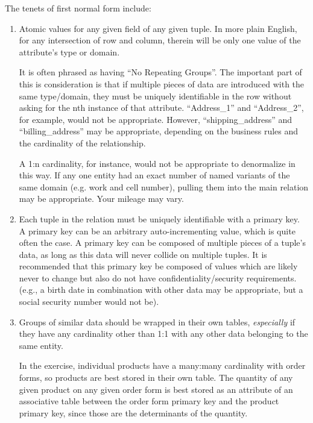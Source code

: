 \documentclass{article}
\begin{document}
The tenets of first normal form include:
\begin{enumerate}
	\item Atomic values for any given field of any given tuple. In
		more plain English, for any intersection of row and
		column, therein will be only one value of the
		attribute's type or domain.
		
		It is often phrased as having ``No Repeating Groups''.
		The important part of this is consideration is that if
		multiple pieces of data are introduced with the same
		type/domain, they must be uniquely identifiable in
		the row without asking for the nth instance of that
		attribute.  ``Address\_1'' and ``Address\_2'', for
		example, would not be appropriate.  However,
		``shipping\_address'' and ``billing\_address'' may be
		appropriate, depending on the business rules and the
		cardinality of the relationship.
		
		A 1:n cardinality, for instance, would not be
		appropriate to denormalize in this way. If any one
		entity had an exact number of named variants of the same
		domain (e.g. work and cell number), pulling them into
		the main relation may be appropriate. Your mileage may
		vary.

	\item Each tuple in the relation must be uniquely identifiable
		with a primary key. A primary key can be an arbitrary
		auto-incrementing value, which is quite often the case.
		A primary key can be composed of multiple pieces of a
		tuple's data, as long as this data will never collide on
		multiple tuples. It is recommended that this primary key
		be composed of values which are likely never to change
		but also do not have confidentiality/security
		requirements. (e.g., a birth date in combination with
		other data may be appropriate, but a social security
		number would not be).

	\item Groups of similar data should be wrapped in their own
		tables, \emph{especially} if they have any cardinality
		other than 1:1 with any other data belonging to the same
		entity.

		In the exercise, individual products have a many:many
		cardinality with order forms, so products are best
		stored in their own table. The quantity of any given
		product on any given order form is best stored as an
		attribute of an associative table between the order form
		primary key and the product primary key, since those are
		the determinants of the quantity.

\end{enumerate}
\end{document}
